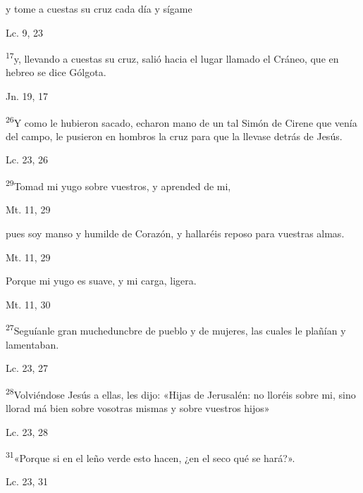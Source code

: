 \documentclass[a4paper,11pt]{article}
\begin{document}
      y tome a cuestas su cruz cada día y sígame
      \begin{flushright}
        Lc. 9, 23
      \end{flushright}

      \textsuperscript{17}y, llevando a cuestas su cruz, salió hacia el lugar llamado el Cráneo, que en hebreo se dice Gólgota.
      \begin{flushright}
        Jn. 19, 17
      \end{flushright}

      \textsuperscript{26}Y como le hubieron sacado, echaron mano de un tal Simón de Cirene que venía del campo, le pusieron en hombros la cruz para que la llevase
      detrás de Jesús.
      \begin{flushright}
        Lc. 23, 26
      \end{flushright}

      \textsuperscript{29}Tomad mi yugo sobre vuestros, y aprended de mi, 
      \begin{flushright}
        Mt. 11, 29  
      \end{flushright}

      pues soy manso y humilde de Corazón, y hallaréis reposo para vuestras almas.
      \begin{flushright}
        Mt. 11, 29
      \end{flushright}

      Porque mi yugo es suave, y mi carga, ligera.
      \begin{flushright}
        Mt. 11, 30
      \end{flushright}

      \textsuperscript{27}Seguíanle gran mucheduncbre de pueblo y de mujeres, las cuales le plañían y lamentaban.
      \begin{flushright}
        Lc. 23, 27
      \end{flushright}

      \textsuperscript{28}Volviéndose Jesús a ellas, les dijo: «Hijas de Jerusalén: no lloréis sobre mi, sino llorad má bien sobre vosotras mismas y sobre
      vuestros hijos»
      \begin{flushright}
        Lc. 23, 28
      \end{flushright}

      \textsuperscript{31}«Porque si en el leño verde esto hacen, ¿en el seco qué se hará?».
      \begin{flushright}
        Lc. 23, 31
      \end{flushright}
\end{document}
